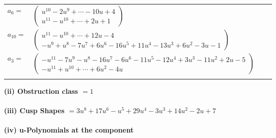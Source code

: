 \documentclass[1p]{elsarticle_modified}
\theoremstyle{definition}
\begin{document}
\begin{tabular}{m{7pt} m{180pt} m{7pt} m{180pt} }
\flushright $a_{6}=$&$\begin{pmatrix}u^{10}-2 u^9+\cdots-10 u+4\\u^{11}- u^{10}+\cdots+2 u+1\end{pmatrix}$ \\
\flushright $a_{10}=$&$\begin{pmatrix}u^{11}- u^{10}+\cdots+12 u-4\\- u^9+u^8-7 u^7+6 u^6-16 u^5+11 u^4-13 u^3+6 u^2-3 u-1\end{pmatrix}$ \\
\flushright $a_{3}=$&$\begin{pmatrix}- u^{11}-7 u^9- u^8-16 u^7-6 u^6-11 u^5-12 u^4+3 u^3-11 u^2+2 u-5\\- u^{11}+u^{10}+\cdots+6 u^2-4 u\end{pmatrix}$\\&\end{tabular}
\flushleft \textbf{(ii) Obstruction class $= 1$}\\~\\
\flushleft \textbf{(iii) Cusp Shapes $= 3 u^8+17 u^6- u^5+29 u^4-3 u^3+14 u^2-2 u+7$}\\~\\
\newpage\renewcommand{\arraystretch}{1}
\flushleft \textbf{(iv) u-Polynomials at the component}\newline \\
\end{document}
